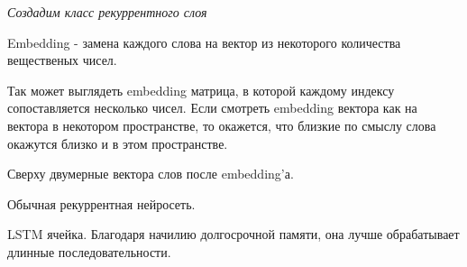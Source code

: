 \textit{Создадим класс рекуррентного слоя}

Embedding - замена каждого слова на вектор из некоторого количества вещественых чисел.


Так может выглядеть embedding матрица, в которой каждому индексу сопоставляется несколько чисел. Если смотреть embedding вектора как на вектора в некотором пространстве, то окажется, что близкие по смыслу слова окажутся близко и в этом пространстве.


Сверху двумерные вектора слов после embedding'а.


\begin{center}
    Обычная рекуррентная нейросеть.
\end{center}


\begin{center}
    LSTM ячейка. Благодаря начилию долгосрочной памяти, она лучше обрабатывает длинные последовательности.
\end{center}

